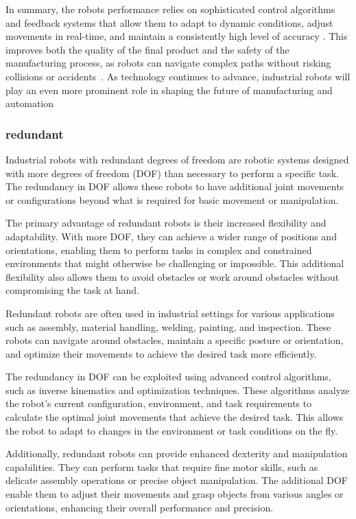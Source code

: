 In summary, the robots performance relies on sophisticated control algorithms and feedback systems that allow them to adapt to dynamic conditions, adjust movements in real-time, and maintain a consistently high level of accuracy \cite{Lin.2023}. This improves both the quality of the final product and the safety of the manufacturing process, as robots can navigate complex paths without risking collisions or accidents~\cite{Bosscher.2011}.
As technology continues to advance, industrial robots will play an even more prominent role in shaping the future of manufacturing and automation \cite{Domae.2019}


\subsubsection{redundant}



Industrial robots with redundant degrees of freedom are robotic systems designed with more degrees of freedom (DOF) than necessary to perform a specific task. The redundancy in DOF allows these robots to have additional joint movements or configurations beyond what is required for basic movement or manipulation.

The primary advantage of redundant robots is their increased flexibility and adaptability. With more DOF, they can achieve a wider range of positions and orientations, enabling them to perform tasks in complex and constrained environments that might otherwise be challenging or impossible. This additional flexibility also allows them to avoid obstacles or work around obstacles without compromising the task at hand.

Redundant robots are often used in industrial settings for various applications such as assembly, material handling, welding, painting, and inspection. These robots can navigate around obstacles, maintain a specific posture or orientation, and optimize their movements to achieve the desired task more efficiently.

The redundancy in DOF can be exploited using advanced control algorithms, such as inverse kinematics and optimization techniques. These algorithms analyze the robot's current configuration, environment, and task requirements to calculate the optimal joint movements that achieve the desired task. This allows the robot to adapt to changes in the environment or task conditions on the fly.

Additionally, redundant robots can provide enhanced dexterity and manipulation capabilities. They can perform tasks that require fine motor skills, such as delicate assembly operations or precise object manipulation. The additional DOF enable them to adjust their movements and grasp objects from various angles or orientations, enhancing their overall performance and precision.




